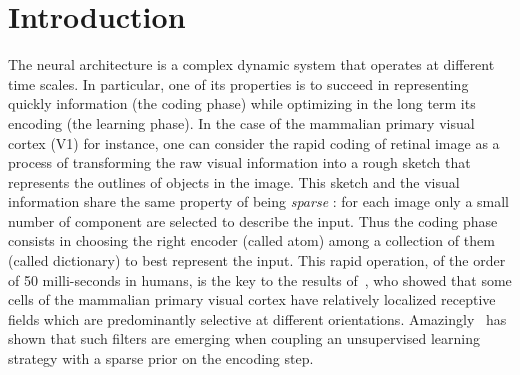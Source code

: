\documentclass[draft]{article} %
\title{\Title}
\author{%
\FirstNameA\ \AuthorA \and \FirstNameB\ \AuthorB \and \FirstNameC\ \AuthorC
}
\date{\Institute\ \\
\Organism\
}
\newcommand{\Abstract}{ %
The formation of structure in the brain, that is, of the connection between cells within neural populations, is by large an unsupervised learning process: The emergence of this architecture is mostly self-organized. In the primary visual cortex of mammals, for example, one may observe during development the emergence of cells selective to localized, oriented features. This leads to the development of a rough representation of contours of the retinal image in area V1. We modeled these representations using sparse unsupervised learning algorithms. These algorithms alternate a coding phase to encode the information with a learning phase to find the proper encoder. A major difficulty faced by these types of algorithms is to deduce good representation while  knowing immature encoders, and to learn good encoders with a non-optimal representation
To address this problem, we propose here to introduce a new regulation process between learning and coding, called homeostasis. Our homeostasis is compatible with a neuro-mimetic architecture and allows for the fast emergence of localized filters sensitive to orientation. The key to this algorithm lies in a simple adaptation mechanism based on non-linear functions that reconciles the antagonistic processes that occur at the coding and learning time scales. We tested this unsupervised algorithm with this homeostasis rule for a range of existing unsupervised learning algorithms coupled with different neural coding algorithms. In addition, we propose a simplification of this optimal homeostasis rule by implementing a simple heuristic on the probability of activation of neurons. Compared to the optimal homeostasis rule, we show that this heuristic allows to implement an even faster unsupervised learning algorithm while keeping a large part of its effectiveness. These results demonstrate the potential application of such a strategy to the fast classification of images, for example in hierarchical and dynamic architectures.
}
\begin{document}
%
\maketitle
\begin{abstract}
\Abstract
\end{abstract}
\thispagestyle{empty}
\section{Introduction}\label{introduction}
The neural architecture is a complex dynamic system that operates at different time scales. In particular, one of its properties is to succeed in representing quickly information (the coding phase) while optimizing in the long term its encoding (the learning phase).
 In the case of the mammalian primary visual cortex (V1) for instance, one can consider the rapid coding of retinal image as a process of transforming the raw visual information into a rough sketch that represents the outlines of objects in the image.
This sketch and the visual information share the same property of being \emph{sparse} : for each image only a small number of component are selected to describe the input. Thus the coding phase consists in choosing the right encoder (called atom) among a collection of them (called dictionary) to  best represent the input.
This rapid operation, of the order of 50 milli-seconds in humans, is the key to the results of~\citet{Hubel68}, who showed that some cells of the mammalian primary visual cortex have relatively localized receptive fields which are predominantly selective at different orientations.
Amazingly~\citet{Olshausen96} has shown that such filters are emerging when coupling an unsupervised learning strategy with a sparse prior on the encoding step.
\end{document}

